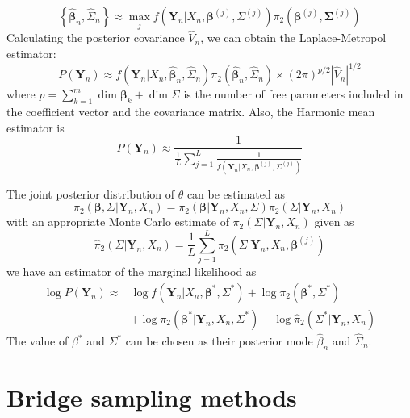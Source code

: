 \documentclass[
]{book}
\theoremstyle{definition}
\theoremstyle{definition}
\theoremstyle{definition}
\theoremstyle{remark}
\begin{document}
\[
\left\{\hat{\boldsymbol{\beta}}_{n}, \hat{\Sigma}_{n}\right\} \approx \max _{j} f\left(\boldsymbol{Y}_{n} | X_{n}, \boldsymbol{\beta}^{(j)}, \Sigma^{(j)}\right) \pi_{2}\left(\boldsymbol{\beta}^{(j)}, \boldsymbol{\Sigma}^{(j)}\right)
\]
Calculating the posterior covariance \(\hat{V}_n\), we can obtain the Laplace-Metropol estimator:
\[
P\left(\boldsymbol{Y}_{n}\right) \approx f\left(\boldsymbol{Y}_{n} | X_{n}, \hat{\boldsymbol{\beta}}_{n}, \hat{\Sigma}_{n}\right) \pi_{2}\left(\hat{\boldsymbol{\beta}}_{n}, \hat{\Sigma}_{n}\right) \times(2 \pi)^{p / 2}\left|\hat{V}_{n}\right|^{1 / 2}
\]
where \(p=\sum_{k=1}^{m} \operatorname{dim} \boldsymbol{\beta}_{k}+\operatorname{dim} \Sigma\) is the number of free parameters included in the coefficient vector and the covariance matrix. Also, the Harmonic mean estimator is
\[
P\left(\boldsymbol{Y}_{n}\right) \approx \frac{1}{\frac{1}{L} \sum_{j=1}^{L} \frac{1}{f\left(\boldsymbol{Y}_{n} | X_{n}, \boldsymbol{\beta}^{(j)}, \Sigma^{(j)}\right)}}
\]

The joint posterior distribution of \(\theta\) can be estimated as
\[
\pi_{2}\left(\boldsymbol{\beta}, \Sigma | \boldsymbol{Y}_{n}, X_{n}\right)=\pi_{2}\left(\boldsymbol{\beta} | \boldsymbol{Y}_{n}, X_{n}, \Sigma\right) \pi_{2}\left(\Sigma | \boldsymbol{Y}_{n}, X_{n}\right)
\]
with an appropriate Monte Carlo estimate of \(\pi_{2}\left(\Sigma | \boldsymbol{Y}_{n}, X_{n}\right)\) given as
\[
\hat{\pi}_{2}\left(\Sigma | \boldsymbol{Y}_{n}, X_{n}\right)=\frac{1}{L} \sum_{j=1}^{L} \pi_{2}\left(\Sigma | \boldsymbol{Y}_{n}, X_{n}, \boldsymbol{\beta}^{(j)}\right)
\]
we have an estimator of the marginal likelihood as
\[
\begin{aligned} \log P\left(\boldsymbol{Y}_{n}\right) \approx & \log f\left(\boldsymbol{Y}_{n} | X_{n}, \boldsymbol{\beta}^{*}, \Sigma^{*}\right)+\log \pi_{2}\left(\boldsymbol{\beta}^{*}, \Sigma^{*}\right) \\ &+\log \pi_{2}\left(\boldsymbol{\beta}^{*} | \boldsymbol{Y}_{n}, X_{n}, \Sigma^{*}\right)+\log \hat{\pi}_{2}\left(\Sigma^{*} | \boldsymbol{Y}_{n}, X_{n}\right) \end{aligned}
\]
The value of \(\beta^*\) and \(\Sigma^*\) can be chosen as their posterior mode \(\hat\beta_n\) and \(\hat\Sigma_n\).

\hypertarget{bridge-sampling-methods}{%
\section{Bridge sampling methods}\label{bridge-sampling-methods}}
\end{document}
